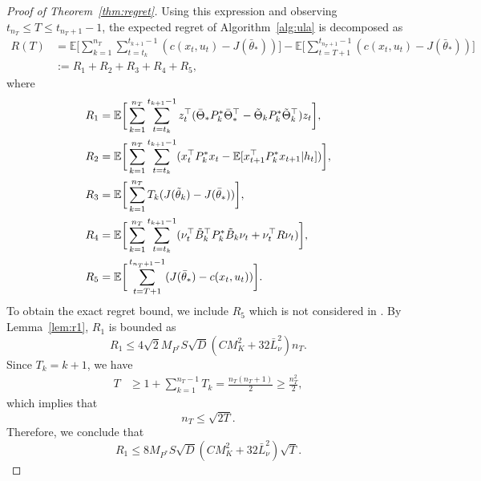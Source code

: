 \documentclass[11pt]{article}
\theoremstyle{plain}
\theoremstyle{definition}
\theoremstyle{remark}
\begin{document}
\begin{proof}[Proof of Theorem~\ref{thm:regret}]
Using this expression and observing $t_{n_T} \leq T \leq t_{n_T+1} - 1$, the expected regret of Algorithm~\ref{alg:ula} is decomposed as
\begin{equation}\nonumber
\begin{split}
R(T) 
& =  \mathbb{E} \bigg [
\sum_{k=1}^{n_T} \sum_{t=t_k}^{t_{k+1} - 1} ( c (x_t, u_t) - J (\bar{\theta}_*))
\bigg ] - \mathbb{E} \bigg [ \sum_{t=T+1}^{t_{n_T+1} - 1} ( c (x_t, u_t) - J (\bar{\theta}_*))  \bigg ]\\&:= R_1 + R_2 + R_3 + R_4 + R_5,
\end{split}
\end{equation}
where
\begin{equation}\nonumber
\begin{split}
R_1 &= \mathbb{E}\bigg[
\sum_{k=1}^{n_T} \sum_{t=t_k}^{t_{k+1} - 1} z_t^\top (
\bar{\Theta}_* P^*_k \bar{\Theta}_*^\top 
- \tilde{\Theta}_k P^*_k\tilde{\Theta}_k^\top 
) z_t 
\bigg ],\\
R_2 &= \mathbb{E}\bigg[
\sum_{k=1}^{n_T} \sum_{t=t_k}^{t_{k+1} - 1} (
x_t^\top P^*_k x_t - 
\mathbb{E} [x_{t+1}^\top P^*_k x_{t+1} | h_t]
)
\bigg ],\\
R_3 &= \mathbb{E} \bigg [
\sum_{k=1}^{n_T} T_k (J (\tilde{\theta}_k) - J(\bar{\theta}_*))
\bigg ],\\
R_4 &=\mathbb{E}\bigg[\sum_{k=1}^{n_T} \sum_{t=t_k}^{t_{k+1} - 1}(\nu_t^{\top} \Tilde{B}_k^{\top}P^*_k\Tilde{B}_k\nu_t +\nu_t^{\top} R \nu_t)\bigg],\\
R_5 &= \mathbb{E} \bigg [ \sum_{t=T+1}^{t_{n_T+1} - 1} (  J (\bar{\theta}_*) - c (x_t, u_t))  \bigg ].
\end{split}
\end{equation}
To obtain the exact regret bound, we include $R_5$  which is not considered in \cite{ouyang2019posterior}.  
By Lemma~\ref{lem:r1}, $R_1$ is bounded as
\[
R_1 \leq 4\sqrt{2}M_{P^*} S\sqrt{D}(C M_K^2+32\bar{L}_{\nu}^2) n_T.
\]
Since $T_k = k+1$, we have
\begin{equation}\nonumber
\begin{split}
T &\geq 1 + \sum_{k=1}^{n_T-1} T_{k} =  \frac{n_T(n_T+1)}{2} \geq\frac{n_T^2}{2},
\end{split}
\end{equation}
which implies that 
\begin{equation}\label{eq:thm:n}
n_T \leq \sqrt{2 T}.
\end{equation} 
Therefore, we conclude that 
\[
R_1 \leq 8M_{P^*} S\sqrt{D}(C M_K^2+32\bar{L}_{\nu}^2) \sqrt{T}.
\]


\end{proof}
\end{document}
